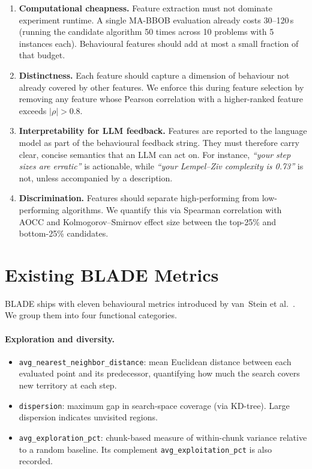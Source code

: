 \begin{enumerate}
  \item \textbf{Computational cheapness.} Feature extraction must not dominate experiment runtime. A single MA-BBOB evaluation already costs 30--120\,s (running the candidate algorithm 50 times across 10 problems with 5 instances each). Behavioural features should add at most a small fraction of that budget.

  \item \textbf{Distinctness.} Each feature should capture a dimension of behaviour not already covered by other features. We enforce this during feature selection by removing any feature whose Pearson correlation with a higher-ranked feature exceeds $|\rho| > 0.8$.

  \item \textbf{Interpretability for LLM feedback.} Features are reported to the language model as part of the behavioural feedback string. They must therefore carry clear, concise semantics that an LLM can act on. For instance, \emph{``your step sizes are erratic''} is actionable, while \emph{``your Lempel--Ziv complexity is 0.73''} is not, unless accompanied by a description.

  \item \textbf{Discrimination.} Features should separate high-performing from low-performing algorithms. We quantify this via Spearman correlation with AOCC and Kolmogorov--Smirnov effect size between the top-25\% and bottom-25\% candidates.
\end{enumerate}

\section{Existing BLADE Metrics}
\label{sec:features:blade}

BLADE ships with eleven behavioural metrics introduced by van~Stein et
al.~\cite{vanStein2025Behaviour, vanStein2025BLADE}.  We group them into four
functional categories.

\paragraph{Exploration and diversity.}
\begin{itemize}
  \item \texttt{avg\_nearest\_neighbor\_distance}: mean Euclidean distance between each evaluated point and its predecessor, quantifying how much the search covers new territory at each step.
  \item \texttt{dispersion}: maximum gap in search-space coverage (via KD-tree). Large dispersion indicates unvisited regions.
  \item \texttt{avg\_exploration\_pct}: chunk-based measure of within-chunk variance relative to a random baseline. Its complement \texttt{avg\_exploitation\_pct} is also recorded.
\end{itemize}


